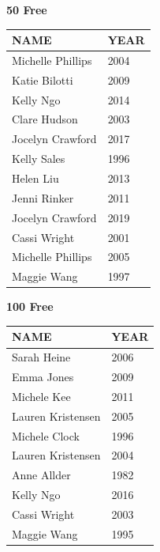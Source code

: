 \begin{table}[H]
\centering
\begin{minipage}[t]{0.48\textwidth}
\centering
\textbf{50 Free}\\[0.1cm]
\begin{tabular}{@{}p{2.8cm}p{1.2cm}@{}}
\hline
    \textbf{NAME} & \textbf{YEAR} \\
\hline
    Michelle Phillips & 2004 \\
    Katie Bilotti & 2009 \\
    Kelly Ngo & 2014 \\
    Clare Hudson & 2003 \\
    Jocelyn Crawford & 2017 \\
    Kelly Sales & 1996 \\
    Helen Liu & 2013 \\
    Jenni Rinker & 2011 \\
    Jocelyn Crawford & 2019 \\
    Cassi Wright & 2001 \\
    Michelle Phillips & 2005 \\
    Maggie Wang & 1997 \\
\hline
\end{tabular}
\end{minipage}\hfill
\begin{minipage}[t]{0.48\textwidth}
\centering
\textbf{100 Free}\\[0.1cm]
\begin{tabular}{@{}p{2.8cm}p{1.2cm}@{}}
\hline
    \textbf{NAME} & \textbf{YEAR} \\
\hline
    Sarah Heine & 2006 \\
    Emma Jones & 2009 \\
    Michele Kee & 2011 \\
    Lauren Kristensen & 2005 \\
    Michele Clock & 1996 \\
    Lauren Kristensen & 2004 \\
    Anne Allder & 1982 \\
    Kelly Ngo & 2016 \\
    Cassi Wright & 2003 \\
    Maggie Wang & 1995 \\
\hline
\end{tabular}
\end{minipage}
\end{table}

